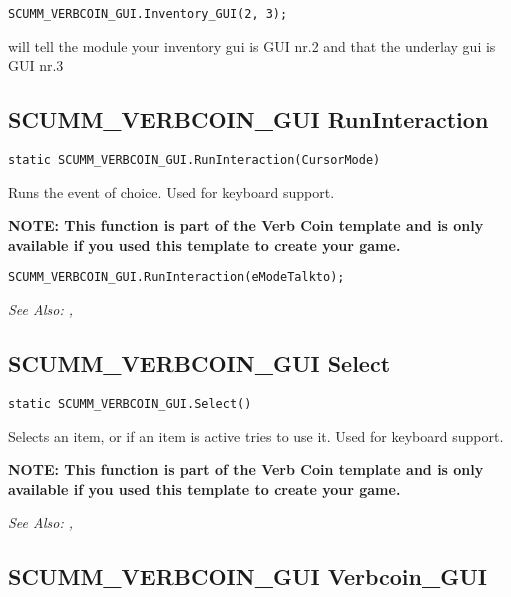 \begin{verbatim}
SCUMM_VERBCOIN_GUI.Inventory_GUI(2, 3);
\end{verbatim}

will tell the module your inventory gui is GUI nr.2 and that the underlay gui is GUI nr.3


\subsection{SCUMM_VERBCOIN_GUI RunInteraction}\label{SCUMM_VERBCOIN_GUI.RunInteraction}%

\begin{verbatim}
static SCUMM_VERBCOIN_GUI.RunInteraction(CursorMode)
\end{verbatim}
Runs the event of choice. Used for keyboard support.

\bf{NOTE:} This function is part of the Verb Coin template and is only available if
you used this template to create your game.

\begin{verbatim}
SCUMM_VERBCOIN_GUI.RunInteraction(eModeTalkto);
\end{verbatim}

\it{See Also:} ,


\subsection{SCUMM_VERBCOIN_GUI Select}\label{SCUMM_VERBCOIN_GUI.Select}%

\begin{verbatim}
static SCUMM_VERBCOIN_GUI.Select()
\end{verbatim}
Selects an item, or if an item is active tries to use it. Used for keyboard support.

\bf{NOTE:} This function is part of the Verb Coin template and is only available if
you used this template to create your game.

\it{See Also:} ,


\subsection{SCUMM_VERBCOIN_GUI Verbcoin_GUI}\label{SCUMM_VERBCOIN_GUI.Verbcoin_GUI}%

